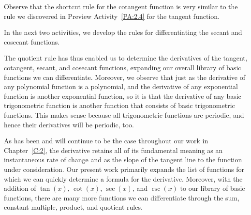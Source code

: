\vspace*{5pt}
\nin {}
\vspace*{1pt}

Observe that the shortcut rule for the cotangent function is very similar to the rule we discovered in Preview Activity~\ref{PA:2.4} for the tangent function.

\vspace*{5pt}
\nin {}
\vspace*{1pt}

In the next two activities, we develop the rules for differentiating the secant and cosecant functions.



\newpage



The quotient rule has thus enabled us to determine the derivatives of the tangent, cotangent, secant, and cosecant functions, expanding our overall library of basic functions we can differentiate.  Moreover, we observe that just as the derivative of any polynomial function is a polynomial, and the derivative of any exponential function is another exponential function, so it is that the derivative of any basic trigonometric function is another function that consists of basic trigonometric functions.  This makes sense because all trigonometric functions are periodic, and hence their derivatives will be periodic, too.

As has been and will continue to be the case throughout our work in Chapter~\ref{C:2}, the derivative retains all of its fundamental meaning as an instantaneous rate of change and as the slope of the tangent line to the function under consideration.  Our present work primarily expands the list of functions for which we can quickly determine a formula for the derivative.  Moreover, with the addition of $\tan(x)$, $\cot(x)$, $\sec(x)$, and $\csc(x)$ to our library of basic functions, there are many more functions we can differentiate through the sum, constant multiple, product, and quotient rules.  

